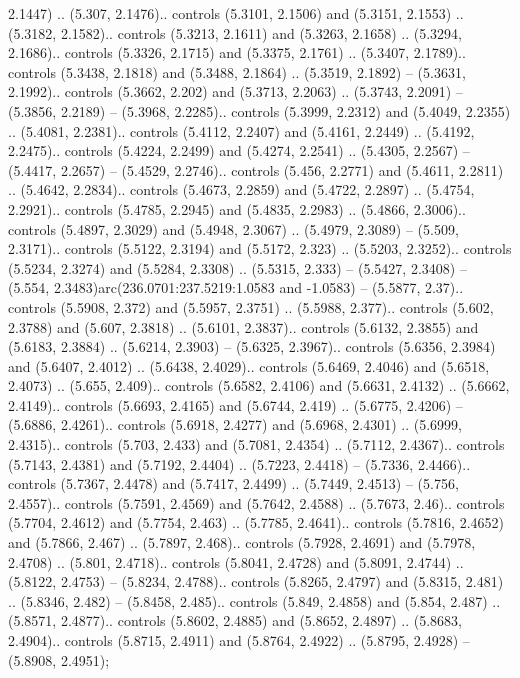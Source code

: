 2.1447) .. (5.307, 2.1476).. controls (5.3101, 2.1506) and (5.3151, 2.1553) .. (5.3182, 2.1582).. controls (5.3213, 2.1611) and (5.3263, 2.1658) .. (5.3294, 2.1686).. controls (5.3326, 2.1715) and (5.3375, 2.1761) .. (5.3407, 2.1789).. controls (5.3438, 2.1818) and (5.3488, 2.1864) .. (5.3519, 2.1892) -- (5.3631, 2.1992).. controls (5.3662, 2.202) and (5.3713, 2.2063) .. (5.3743, 2.2091) -- (5.3856, 2.2189) -- (5.3968, 2.2285).. controls (5.3999, 2.2312) and (5.4049, 2.2355) .. (5.4081, 2.2381).. controls (5.4112, 2.2407) and (5.4161, 2.2449) .. (5.4192, 2.2475).. controls (5.4224, 2.2499) and (5.4274, 2.2541) .. (5.4305, 2.2567) -- (5.4417, 2.2657) -- (5.4529, 2.2746).. controls (5.456, 2.2771) and (5.4611, 2.2811) .. (5.4642, 2.2834).. controls (5.4673, 2.2859) and (5.4722, 2.2897) .. (5.4754, 2.2921).. controls (5.4785, 2.2945) and (5.4835, 2.2983) .. (5.4866, 2.3006).. controls (5.4897, 2.3029) and (5.4948, 2.3067) .. (5.4979, 2.3089) -- (5.509, 2.3171).. controls (5.5122, 2.3194) and (5.5172, 2.323) .. (5.5203, 2.3252).. controls (5.5234, 2.3274) and (5.5284, 2.3308) .. (5.5315, 2.333) -- (5.5427, 2.3408) -- (5.554, 2.3483)arc(236.0701:237.5219:1.0583 and -1.0583) -- (5.5877, 2.37).. controls (5.5908, 2.372) and (5.5957, 2.3751) .. (5.5988, 2.377).. controls (5.602, 2.3788) and (5.607, 2.3818) .. (5.6101, 2.3837).. controls (5.6132, 2.3855) and (5.6183, 2.3884) .. (5.6214, 2.3903) -- (5.6325, 2.3967).. controls (5.6356, 2.3984) and (5.6407, 2.4012) .. (5.6438, 2.4029).. controls (5.6469, 2.4046) and (5.6518, 2.4073) .. (5.655, 2.409).. controls (5.6582, 2.4106) and (5.6631, 2.4132) .. (5.6662, 2.4149).. controls (5.6693, 2.4165) and (5.6744, 2.419) .. (5.6775, 2.4206) -- (5.6886, 2.4261).. controls (5.6918, 2.4277) and (5.6968, 2.4301) .. (5.6999, 2.4315).. controls (5.703, 2.433) and (5.7081, 2.4354) .. (5.7112, 2.4367).. controls (5.7143, 2.4381) and (5.7192, 2.4404) .. (5.7223, 2.4418) -- (5.7336, 2.4466).. controls (5.7367, 2.4478) and (5.7417, 2.4499) .. (5.7449, 2.4513) -- (5.756, 2.4557).. controls (5.7591, 2.4569) and (5.7642, 2.4588) .. (5.7673, 2.46).. controls (5.7704, 2.4612) and (5.7754, 2.463) .. (5.7785, 2.4641).. controls (5.7816, 2.4652) and (5.7866, 2.467) .. (5.7897, 2.468).. controls (5.7928, 2.4691) and (5.7978, 2.4708) .. (5.801, 2.4718).. controls (5.8041, 2.4728) and (5.8091, 2.4744) .. (5.8122, 2.4753) -- (5.8234, 2.4788).. controls (5.8265, 2.4797) and (5.8315, 2.481) .. (5.8346, 2.482) -- (5.8458, 2.485).. controls (5.849, 2.4858) and (5.854, 2.487) .. (5.8571, 2.4877).. controls (5.8602, 2.4885) and (5.8652, 2.4897) .. (5.8683, 2.4904).. controls (5.8715, 2.4911) and (5.8764, 2.4922) .. (5.8795, 2.4928) -- (5.8908, 2.4951);



